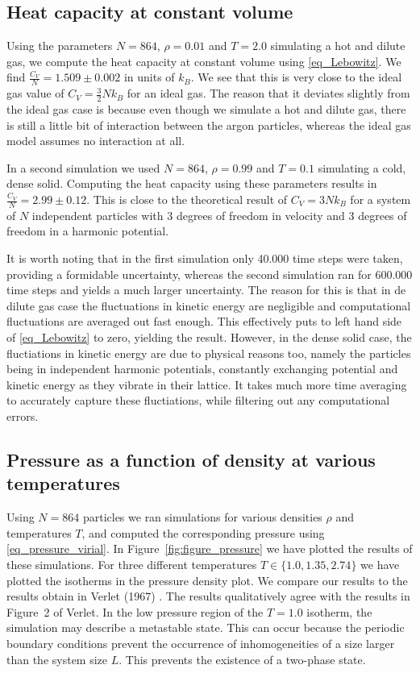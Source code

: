 \documentclass[twoside]{article}
\begin{document}
\subsection{Heat capacity at constant volume}
Using the parameters $N=864$, $\rho=0.01$ and $T=2.0$ simulating a hot and dilute gas, we compute the heat capacity at constant volume using \eqref{eq_Lebowitz}. We find $\frac{C_V}{N} = 1.509  \pm 0.002 $ in units of $k_B$. We see that this is very close to the ideal gas value of $C_V = \frac{3}{2} N k_B$ for an ideal gas. The reason that it deviates slightly from the ideal gas case is because even though we simulate a hot and dilute gas, there is still a little bit of interaction between the argon particles, whereas the ideal gas model assumes no interaction at all.

In a second simulation we used $N=864$, $\rho=0.99$ and $T=0.1$ simulating a cold, dense solid. Computing the heat capacity using these parameters results in $\frac{C_V}{N} = 2.99  \pm  0.12 $. This is close to the theoretical result of $C_V = 3 N k_B$ for a system of $N$ independent particles with 3 degrees of freedom in velocity and 3 degrees of freedom in a harmonic potential. 

It is worth noting that in the first simulation only 40.000 time steps were taken, providing a formidable uncertainty, whereas the second simulation ran for 600.000 time steps and yields a much larger uncertainty. The reason for this is that in de dilute gas case the fluctuations in kinetic energy are negligible and computational fluctuations are averaged out fast enough. This effectively puts to left hand side of \eqref{eq_Lebowitz} to zero, yielding the result. However, in the dense solid case, the fluctiations in kinetic energy are due to physical reasons too, namely the particles being in independent harmonic potentials, constantly exchanging potential and kinetic energy as they vibrate in their lattice. It takes much more time averaging to accurately capture these fluctiations, while filtering out any computational errors. 

\subsection{Pressure as a function of density at various temperatures}
Using $N = 864$ particles we ran simulations for various densities $\rho$ and temperatures $T$, and computed the corresponding pressure using \eqref{eq_pressure_virial}. In Figure~\ref{fig:figure_pressure} we have plotted the results of these simulations. For three different temperatures $T \in \{1.0, 1.35, 2.74 \}$ we have plotted the isotherms in the pressure density plot. We compare our results to the results obtain in Verlet (1967) \cite{ref_verlet}. The results qualitatively agree with the results in Figure~2 of Verlet. In the low pressure region of the $T=1.0$ isotherm, the simulation may describe a metastable state. This can occur because the periodic boundary conditions prevent the occurrence of inhomogeneities of a size larger than the system size $L$. This prevents the existence of a two-phase state.
\end{document}
